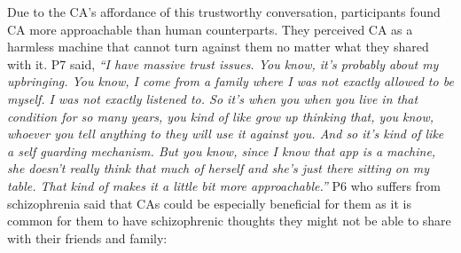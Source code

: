         Due to the \ac{CA}'s affordance of this trustworthy conversation, participants found \ac{CA} more approachable than human counterparts. They perceived \ac{CA} as a harmless machine that cannot turn against them no matter what they shared with it. P7 said,
                \textit{
                ``I have massive trust issues. You know, it's probably about my upbringing. You know, I come from a family where I was not exactly allowed to be myself. I was not exactly listened to. So it's when you when you live in that condition for so many years, you kind of like grow up thinking that, you know, whoever you tell anything to they will use it against you. And so it's kind of like a self guarding mechanism. But you know, since I know that \acl{app} is a machine, she doesn't really think that much of herself and she's just there sitting on my table. That kind of makes it a little bit more approachable.''
                }
        P6 who suffers from schizophrenia said that \acp{CA} could be especially beneficial for them as it is common for them to have schizophrenic thoughts they might  not be able to share with their friends and family:

